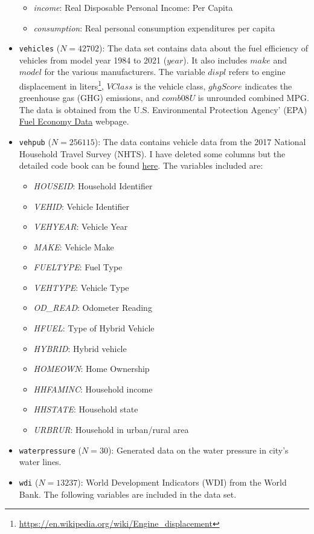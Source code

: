 \documentclass[
]{article}
\begin{document}
\begin{itemize}
  \begin{itemize}
  \item \emph{income}: Real Disposable Personal Income: Per Capita
  \item \emph{consumption}: Real personal consumption expenditures per capita
  \end{itemize}
\item
  \texttt{vehicles} (\(N=42702\)): The data set contains data about the fuel efficiency of vehicles from model year 1984 to 2021 (\(year\)). It also includes \(make\) and \(model\) for the various manufacturers. The variable \(displ\) refers to engine displacement in liters\footnote{\url{https://en.wikipedia.org/wiki/Engine_displacement}}, \(VClass\) is the vehicle class, \(ghgScore\) indicates the greenhouse gas (GHG) emissions, and \(comb08U\) is unrounded combined MPG. The data is obtained from the U.S. Environmental Protection Agency' (EPA) \href{https://www.fueleconomy.gov/feg/download.shtml}{Fuel Economy Data} webpage.
\item
  \texttt{vehpub} (\(N=256115\)): The data contains vehicle data from the 2017 National Household Travel Survey (NHTS). I have deleted some columns but the detailed code book can be found \href{https://nhts.ornl.gov/tables09/CodebookBrowser.aspx}{here}. The variables included are:

  \begin{itemize}
  \item \emph{HOUSEID}: Household Identifier 
  \item \emph{VEHID}: Vehicle Identifier
  \item \emph{VEHYEAR}: Vehicle Year
  \item \emph{MAKE}: Vehicle Make
  \item \emph{FUELTYPE}: Fuel Type
  \item \emph{VEHTYPE}: Vehicle Type
  \item \emph{OD\_READ}: Odometer Reading
  \item \emph{HFUEL}: Type of Hybrid Vehicle
  \item \emph{HYBRID}: Hybrid vehicle
  \item \emph{HOMEOWN}: Home Ownership
  \item \emph{HHFAMINC}: Household income
  \item \emph{HHSTATE}: Household state
  \item \emph{URBRUR}: Household in urban/rural area
  \end{itemize}
\item
  \texttt{waterpressure} (\(N=30\)): Generated data on the water pressure in city's water lines.
\item
  \texttt{wdi} (\(N=13237\)): World Development Indicators (WDI) from the World Bank. The following variables are included in the data set.
\end{itemize}
\end{document}
